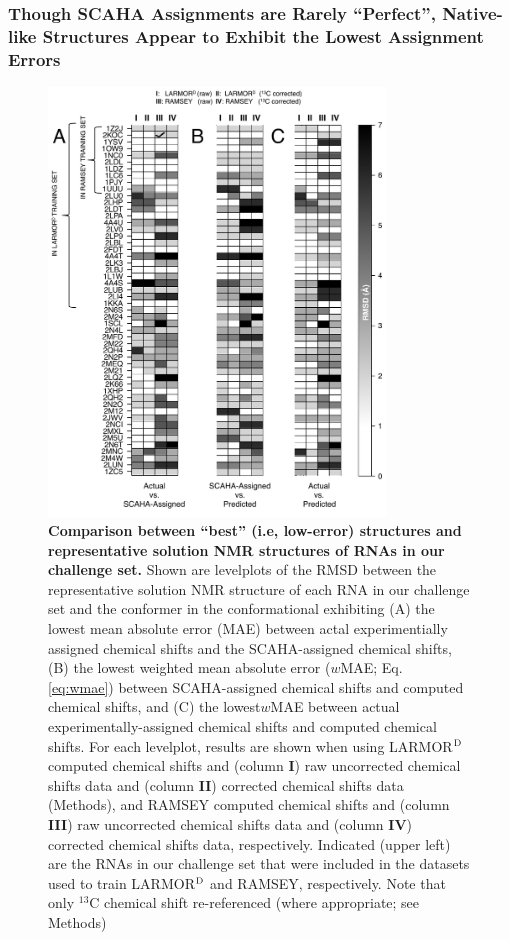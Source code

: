 \documentclass[journal=jcisd8,manuscript=article,layout=onecolumn]{achemso}
\begin{document}
{\subsubsection{Though SCAHA Assignments are Rarely ``Perfect'',  Native-like Structures Appear to Exhibit the Lowest Assignment Errors} 
\begin{figure}[h!]
  \centering
       \includegraphics[width=0.8\textwidth]{figure_2}
  \caption{\textbf{Comparison between ``best'' (i.e, low-error) structures and representative solution NMR structures of RNAs in our challenge set.} Shown are levelplots of the RMSD between the representative solution NMR structure of each RNA in our challenge set and the conformer in the conformational exhibiting (A) the lowest mean absolute error (MAE) between actal experimentially assigned chemical shifts and the SCAHA-assigned chemical shifts, (B)   the lowest weighted mean absolute error ($w$MAE; Eq. \ref{eq:wmae}) between SCAHA-assigned chemical shifts and computed chemical shifts, and (C) the lowest$w$MAE between actual experimentally-assigned chemical shifts and computed chemical shifts. For each levelplot, results are shown when using LARMOR$^{\rm D}$ computed chemical shifts  and (column \textbf{I}) raw uncorrected chemical shifts data and  (column \textbf{II}) corrected chemical shifts data (Methods), and RAMSEY computed chemical shifts  and (column \textbf{III}) raw uncorrected chemical shifts data and  (column \textbf{IV}) corrected chemical shifts data, respectively. Indicated (upper left) are the RNAs in our challenge set that were included in the datasets used to train LARMOR$^{\rm D}$ and RAMSEY, respectively. Note that only $^{13}$C chemical shift re-referenced (where appropriate; see Methods)}
  \label{fig:levelplot}
\end{figure}

}
\end{document}
